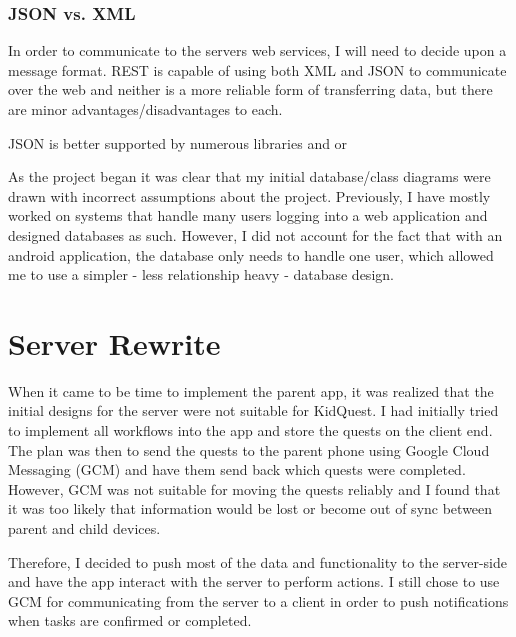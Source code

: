 \subsubsection{JSON vs. XML}
In order to communicate to the servers web services, I will need to decide upon a message format. 
REST is capable of using both XML and JSON to communicate over the web and neither is a more reliable form of transferring data, but there are minor advantages/disadvantages to each.

JSON is better supported by numerous libraries and or






As the project began it was clear that my initial database/class diagrams were drawn with incorrect assumptions about the project. 
Previously, I have mostly worked on systems that handle many users logging into a web application and designed databases as such. 
However, I did not account for the fact that with an android application, the database only needs to handle one user, which allowed me to use a simpler - less relationship heavy - database design.

\section{Server Rewrite}
When it came to be time to implement the parent app, it was realized that the initial designs for the server were not suitable for KidQuest.
I had initially tried to implement all workflows into the app and store the quests on the client end. 
The plan was then to send the quests to the parent phone using Google Cloud Messaging (GCM) and have them send back which quests were completed.
However, GCM was not suitable for moving the quests reliably and I found that it was too likely that information would be lost or become out of sync between parent and child devices.

Therefore, I decided to push most of the data and functionality to the server-side and have the app interact with the server to perform actions.
I still chose to use GCM for communicating from the server to a client in order to push notifications when tasks are confirmed or completed.

